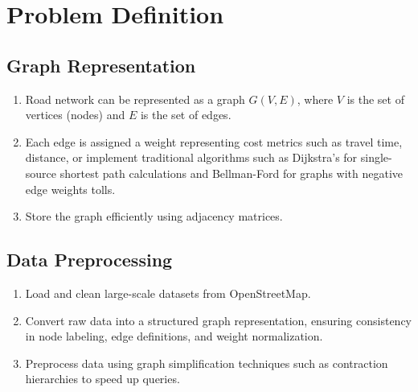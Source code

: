 \chapter{Problem Definition}




\section{Graph Representation}

\begin{enumerate}
	\item Road network can be represented as a graph $G(V, E)$, where $V$ is the set of vertices (nodes) and $E$ is the set of edges.
	\item Each edge is assigned a weight representing cost metrics such as travel time, distance, or implement traditional algorithms such as Dijkstra’s for single-source shortest path calculations and Bellman-Ford for graphs with negative edge weights tolls. 
	\item Store the graph efficiently using adjacency matrices.
\end{enumerate}

\section{Data Preprocessing}
\begin{enumerate}
	
	\item Load and clean large-scale datasets from OpenStreetMap.
	\item  Convert raw data into a structured graph representation, ensuring consistency in node labeling, edge definitions, and weight normalization. 
	\item Preprocess data using graph simplification techniques such as contraction hierarchies to speed up queries.
	
\end{enumerate}

